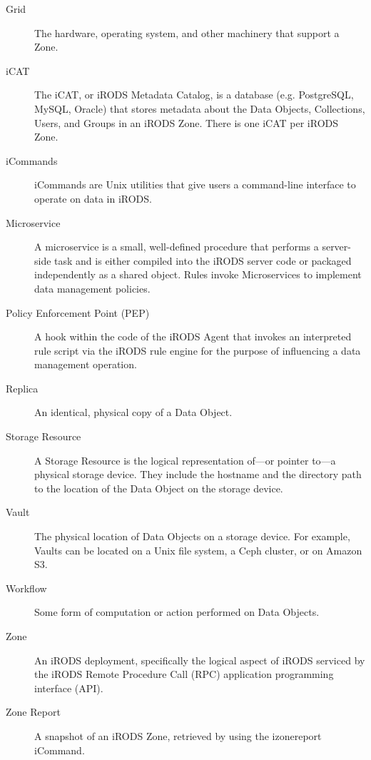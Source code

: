 \documentclass[10pt,oneside]{memoir}
\begin{document}
\begin{description}
\item [Grid]
The hardware, operating system, and other machinery that support a Zone.

\item [iCAT]
The iCAT, or iRODS Metadata Catalog, is a database (e.g. PostgreSQL, MySQL, Oracle) that stores metadata about the Data Objects, Collections, Users, and Groups in an iRODS Zone. There is one iCAT per iRODS Zone.

\item [iCommands]
iCommands are Unix utilities that give users a command-line interface to operate on data in iRODS.

\item [Microservice]
A microservice is a small, well-defined procedure that performs a server-side task and is either compiled into the iRODS server code or packaged independently as a shared object. Rules invoke Microservices to implement data management policies.

\item [Policy Enforcement Point (PEP)]
A hook within the code of the iRODS Agent that invokes an interpreted rule script via the iRODS rule engine for the purpose of influencing a data management operation.

\item [Replica]
An identical, physical copy of a Data Object.

\item [Storage Resource]
A Storage Resource is the logical representation of---or pointer to---a physical storage device. They include the hostname and the directory path to the location of the Data Object on the storage device.

\item [Vault]
The physical location of Data Objects on a storage device. For example, Vaults can be located on a Unix file system, a Ceph cluster, or on Amazon S3.

\item [Workflow]
Some form of computation or action performed on Data Objects.

\item [Zone]
An iRODS deployment, specifically the logical aspect of iRODS serviced by the iRODS Remote Procedure Call (RPC) application programming interface (API).

\item [Zone Report]
A snapshot of an iRODS Zone, retrieved by using the izonereport iCommand.

\end{description}
\end{document}
